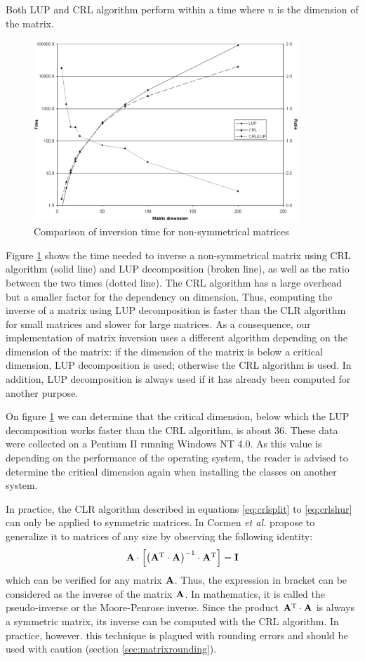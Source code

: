 \documentclass[twoside]{book}
\begin{document}
Both LUP and CRL algorithm perform within a time  where
$n$ is the dimension of the matrix.
\begin{figure}
\centering\includegraphics[width=10cm]{Figures/InversionTime}
\caption{Comparison of inversion time for non-symmetrical
matrices}\label{fig:inversionTime}
\end{figure}
Figure \ref{fig:inversionTime} shows the time needed to inverse a
non-symmetrical matrix using CRL algorithm (solid line) and LUP
decomposition (broken line), as well as the ratio between the two
times (dotted line). The CRL algorithm has a large overhead but a
smaller factor for the dependency on dimension. Thus, computing
the inverse of a matrix using LUP decomposition is faster than the
CLR algorithm for small matrices and slower for large matrices. As
a consequence, our implementation of matrix inversion uses a
different algorithm depending on the dimension of the matrix: if
the dimension of the matrix is below a critical dimension, LUP
decomposition is used; otherwise the CRL algorithm is used. In
addition, LUP decomposition is always used if it has already been
computed for another purpose.

On figure \ref{fig:inversionTime} we can determine that the
critical dimension, below which the LUP decomposition works faster
than the CRL algorithm, is about 36. These data were collected on
a Pentium II running Windows NT 4.0. As this value is depending on
the performance of the operating system, the reader is advised to
determine the critical dimension again when installing the classes
on another system.

In practice, the CLR algorithm described in equations
\ref{eq:crlsplit} to \ref{eq:crlshur} can only be applied to
symmetric matrices. In \cite{CorLeiRiv} Cormen {\it et al.}
propose to generalize it to matrices of any size by observing the
following identity:
\begin{equation}
\label{eq:pseudoinverse}
  {\bf A}\cdot\left[\left({\bf A}^{\mathop{\rm T}}\cdot{\bf A}\right)^{-1}\cdot{\bf A}^{\mathop{\rm T}}\right]={\bf I}
\end{equation}
which can be verified for any matrix ${\bf A}$. Thus, the
expression in bracket can be considered as the inverse of the
matrix ${\bf A}$. In mathematics, it is called the pseudo-inverse
or the Moore-Penrose inverse. Since the product
${\bf A}^{\mathop{\rm T}}\cdot{\bf A}$ is always a symmetric matrix, its
inverse can be computed with the CRL algorithm. In practice,
however. this technique is plagued with rounding errors and should
be used with caution (\cf section \ref{sec:matrixrounding}).
\end{document}
